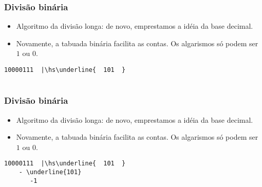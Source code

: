 \documentclass{beamer}
\begin{document}


\begin{frame}[fragile]
\frametitle{Divisão binária}

\begin{itemize}
\item Algoritmo da divisão longa: de novo, emprestamos a idéia da base decimal.
\pause
\item Novamente, a tabuada binária facilita as contas. Os algarismos só podem ser $1$ ou $0$.
\end{itemize}

\def\hs{\hspace{-1mm}}

\begin{Verbatim}[commandchars=\\\{\},codes={\catcode`$=3\catcode`^=7}]
      10000111  |\hs\underline{  101  }


\end{Verbatim}

\end{frame}


\begin{frame}[fragile]
\frametitle{Divisão binária}

\begin{itemize}
\item Algoritmo da divisão longa: de novo, emprestamos a idéia da base decimal.

\item Novamente, a tabuada binária facilita as contas. Os algarismos só podem ser $1$ ou $0$.
\end{itemize}

\def\hs{\hspace{-1mm}}

\begin{Verbatim}[commandchars=\\\{\},codes={\catcode`$=3\catcode`^=7}]
      10000111  |\hs\underline{  101  }
    - \underline{101}
       -1
\end{Verbatim}

\end{frame}

\end{document}
